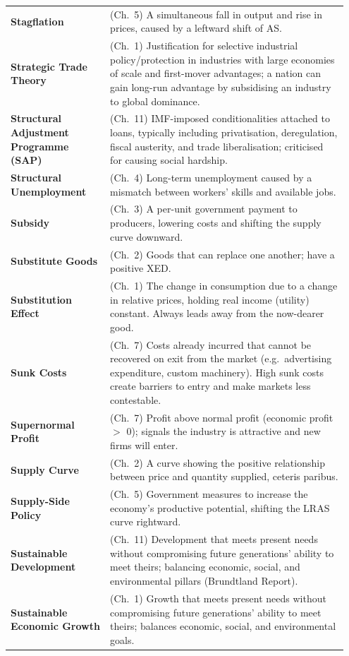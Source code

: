 \documentclass[11pt, a4paper, twoside]{book}
\begin{document}
\begin{longtable}{@{}>{\RaggedRight\arraybackslash}p{0.28\linewidth}>{\RaggedRight\arraybackslash}p{0.67\linewidth}@{}}
\textbf{Stagflation} & (Ch.~5) A simultaneous fall in output and rise in prices, caused by a leftward shift of AS. \\
\textbf{Strategic Trade Theory} & (Ch.~1) Justification for selective industrial policy/protection in industries with large economies of scale and first-mover advantages; a nation can gain long-run advantage by subsidising an industry to global dominance. \\
\textbf{Structural Adjustment Programme (SAP)} & (Ch.~11) IMF-imposed conditionalities attached to loans, typically including privatisation, deregulation, fiscal austerity, and trade liberalisation; criticised for causing social hardship. \\
\textbf{Structural Unemployment} & (Ch.~4) Long-term unemployment caused by a mismatch between workers' skills and available jobs. \\
\textbf{Subsidy} & (Ch.~3) A per-unit government payment to producers, lowering costs and shifting the supply curve downward. \\
\textbf{Substitute Goods} & (Ch.~2) Goods that can replace one another; have a positive XED. \\
\textbf{Substitution Effect} & (Ch.~1) The change in consumption due to a change in relative prices, holding real income (utility) constant. Always leads away from the now-dearer good. \\
\textbf{Sunk Costs} & (Ch.~7) Costs already incurred that cannot be recovered on exit from the market (e.g.\ advertising expenditure, custom machinery). High sunk costs create barriers to entry and make markets less contestable. \\
\textbf{Supernormal Profit} & (Ch.~7) Profit above normal profit (economic profit $>$ 0); signals the industry is attractive and new firms will enter. \\
\textbf{Supply Curve} & (Ch.~2) A curve showing the positive relationship between price and quantity supplied, ceteris paribus. \\
\textbf{Supply-Side Policy} & (Ch.~5) Government measures to increase the economy's productive potential, shifting the LRAS curve rightward. \\
\textbf{Sustainable Development} & (Ch.~11) Development that meets present needs without compromising future generations' ability to meet theirs; balancing economic, social, and environmental pillars (Brundtland Report). \\
\textbf{Sustainable Economic Growth} & (Ch.~1) Growth that meets present needs without compromising future generations' ability to meet theirs; balances economic, social, and environmental goals. \\


\end{longtable}
\end{document}
